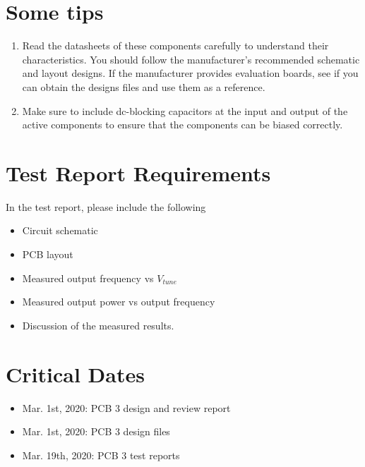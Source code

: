 \documentclass[letterpaper, 11pt]{article}
\begin{document}
\section{Some tips}

\begin{enumerate}
	\item Read the datasheets of these components carefully to understand their characteristics. You should follow the manufacturer's recommended schematic and layout designs. If the manufacturer provides evaluation boards, see if you can obtain the designs files and use them as a reference.
	
	\item Make sure to include dc-blocking capacitors at the input and output of the active components to ensure that the components can be biased correctly. 
	
\end{enumerate}
 
\section{Test Report Requirements}
In the test report, please include the following
\begin{itemize}
	\item Circuit schematic 
	\item PCB layout 
	\item Measured output frequency vs $V_{tune}$
	\item Measured output power vs output frequency
	\item Discussion of the measured results. 	
\end{itemize}

\section{Critical Dates}

\begin{itemize}
	\item Mar. 1st, 2020: PCB 3 design and review report 
	\item Mar. 1st, 2020: PCB 3 design files 
	\item Mar. 19th, 2020: PCB 3 test reports
\end{itemize}
\end{document}
